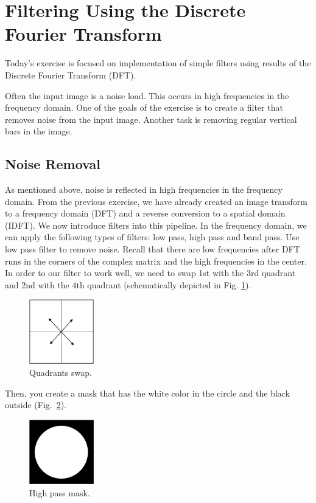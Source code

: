 \documentclass[12pt]{article}
\begin{document}
\section*{Filtering Using the Discrete Fourier Transform}

Today's exercise is focused on implementation of simple filters using results of the Discrete Fourier Transform (DFT).

Often the input image is a noise load. This occurs in high frequencies in the frequency domain.
One of the goals of the exercise is to create a filter that removes noise from the input image.
Another task is removing regular vertical bars in the image.

\subsection*{Noise Removal}

As mentioned above, noise is reflected in high frequencies in the frequency domain.
From the previous exercise, we have already created an image transform to a frequency domain (DFT) and a reverse conversion to a spatial domain (IDFT).
We now introduce filters into this pipeline.
In the frequency domain, we can apply the following types of filters: low pass, high pass and band pass.
Use low pass filter to remove noise.
Recall that there are low frequencies after DFT runs in the corners of the complex matrix and the high frequencies in the center.
In order to our filter to work well, we need to swap 1st with the 3rd quadrant and 2nd with the 4th quadrant (schematically depicted in Fig. \ref{fig:quadrants}).

\begin{figure}[h]
\centering
\includegraphics[width=0.25\textwidth]{images/quadrants.png}
\caption{Quadrants swap.}
\label{fig:quadrants}
\end{figure}

Then, you create a mask that has the white color in the circle and the black outside (Fig.~\ref{fig:mask}).

\begin{figure}[h]
\centering
\includegraphics[width=0.25\textwidth]{images/mask.png}
\caption{High pass mask.}
\label{fig:mask}
\end{figure}
\end{document}
